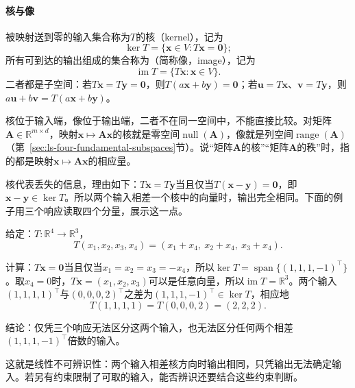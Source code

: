 \paragraph{核与像}
被映射送到零的输入集合称为$T$的核（kernel），记为
\[
 \ker T=\{\bm x\in V:T\bm x=\bm0\};
\]
所有可到达的输出组成的集合称为（简称像，image），记为
\[
 \operatorname{im}T=\{T\bm x:\bm x\in V\}.
\]
二者都是子空间：若$T\bm x=T\bm y=\bm0$，则$T(a\bm x+b\bm y)=\bm0$；若$\bm u=T\bm x$、$\bm v=T\bm y$，则$a\bm u+b\bm v=T(a\bm x+b\bm y)$。

核位于输入端，像位于输出端，二者不在同一空间中，不能直接比较。对矩阵$\bm A\in\mathbb R^{m\times d}$，映射$\bm x\mapsto\bm A\bm x$的核就是零空间$\operatorname{null}(\bm A)$，像就是列空间$\operatorname{range}(\bm A)$（第~\ref{sec:ls-four-fundamental-subspaces}节）。说“矩阵$\bm A$的核”“矩阵$\bm A$的秩”时，指的都是映射$\bm x\mapsto\bm A\bm x$的相应量。

核代表丢失的信息，理由如下：$T\bm x=T\bm y$当且仅当$T(\bm x-\bm y)=\bm0$，即$\bm x-\bm y\in\ker T$。所以两个输入相差一个核中的向量时，输出完全相同。下面的例子用三个响应读取四个分量，展示这一点。
\begin{example}[相差核方向的输入给出相同输出]
\label{ex:ls-kernel-indistinguishable}
给定：$T:\mathbb R^4\to\mathbb R^3$，
\[
 T(x_1,x_2,x_3,x_4)=(x_1+x_4,\ x_2+x_4,\ x_3+x_4).
\]

计算：$T\bm x=\bm0$当且仅当$x_1=x_2=x_3=-x_4$，所以$\ker T=\operatorname{span}\{(1,1,1,-1)^{\top}\}$。取$x_4=0$时，$T\bm x=(x_1,x_2,x_3)$可以是任意向量，所以$\operatorname{im}T=\mathbb R^3$。两个输入$(1,1,1,1)^\top$与$(0,0,0,2)^\top$之差为$(1,1,1,-1)^\top\in\ker T$，相应地
\[
 T(1,1,1,1)=T(0,0,0,2)=(2,2,2).
\]

结论：仅凭三个响应无法区分这两个输入，也无法区分任何两个相差$(1,1,1,-1)^\top$倍数的输入。
\end{example}
这就是线性不可辨识性：两个输入相差核方向时输出相同，只凭输出无法确定输入。若另有约束限制了可取的输入，能否辨识还要结合这些约束判断。

